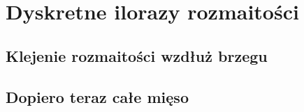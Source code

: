 \section{Dyskretne ilorazy rozmaitości}

\subsection{Klejenie rozmaitości wzdłuż brzegu}

\subsection{Dopiero teraz całe mięso}
